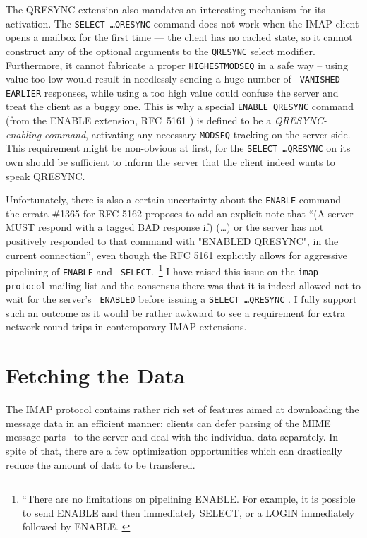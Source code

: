 \documentclass[trojita]{subfiles}
\begin{document}
The QRESYNC extension also mandates an interesting mechanism for its activation.  The {\tt SELECT \ldots QRESYNC}
command does not work when the IMAP client opens a mailbox for the first time --- the client has no cached state, so it
cannot construct any of the optional arguments to the {\tt QRESYNC} select modifier.  Furthermore, it cannot fabricate a
proper {\tt HIGHESTMODSEQ} in a safe way -- using value too low would result in needlessly sending a huge number of {\tt
VANISHED EARLIER} responses, while using a too high value could confuse the server and treat the client as a buggy one.
This is why a special {\tt ENABLE QRESYNC} command (from the ENABLE extension, RFC~5161 \cite{rfc5161}) is defined to be
a {\em QRESYNC-enabling command}, activating any necessary {\tt MODSEQ} tracking on the server side.  This requirement
might be non-obvious at first, for the {\tt SELECT \ldots QRESYNC} on its own should be sufficient to inform the server
that the client indeed wants to speak QRESYNC.

Unfortunately, there is also a certain uncertainty about the {\tt ENABLE} command --- the errata \#1365 for RFC 5162
\cite{rfc5162-errata} proposes to add an explicit note that ``(A server MUST respond with a tagged BAD
response if) (\ldots) or the server has not positively responded to that command with "ENABLED QRESYNC", in the current
connection'', even though the RFC 5161 explicitly allows for aggressive pipelining of {\tt ENABLE} and {\tt
SELECT}.~\footnote{``There are no limitations on pipelining ENABLE.  For example, it is possible to send ENABLE and then
immediately SELECT, or a LOGIN immediately followed by ENABLE. \cite[p. 2]{rfc5161}}  I have raised this issue on the
{\tt imap-protocol} mailing list and the consensus there was that it is indeed allowed not to wait for the server's {\tt
ENABLED} before issuing a {\tt SELECT \ldots QRESYNC} \cite{melnikov-qresync-enable}.  I fully support such an outcome
as it would be rather awkward to see a requirement for extra network round trips in contemporary IMAP extensions.

\section{Fetching the Data}

The IMAP protocol contains rather rich set of features aimed at downloading the message data in an efficient manner;
clients can defer parsing of the MIME message parts~\cite{rfc2045} to the server and deal with the individual data
separately.  In spite of that, there are a few optimization opportunities which can drastically reduce the amount of
data to be transfered.
\end{document}
